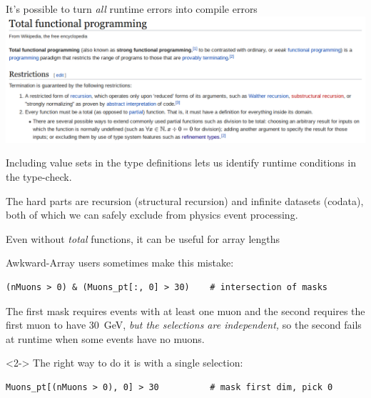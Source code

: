 \documentclass[aspectratio=169]{beamer}
\begin{document}
\begin{frame}{It's possible to turn {\it all} runtime errors into compile errors}
\large
\vspace{0.4 cm}
\includegraphics[width=0.98\linewidth]{totalfunctional-wikipedia.png}

\vspace{0.25 cm}
Including value sets in the type definitions lets us identify runtime conditions in the type-check.

\vspace{0.25 cm}
The hard parts are recursion (structural recursion) and infinite datasets (codata), both of which we can safely exclude from physics event processing.
\end{frame}

\begin{frame}[fragile]{Even without {\it total} functions, it can be useful for array lengths}
\large
\vspace{0.5 cm}

Awkward-Array users sometimes make this mistake:

\small\begin{verbatim}
(nMuons > 0) & (Muons_pt[:, 0] > 30)    # intersection of masks
\end{verbatim}
\large

\vspace{0.25 cm}
The first mask requires events with at least one muon and the second requires the first muon to have 30~GeV, {\it but the selections are independent,} so the second fails at runtime when some events have no muons.

\vspace{0.5 cm}
\begin{uncoverenv}<2->
The right way to do it is with a single selection:

\small\begin{verbatim}
Muons_pt[(nMuons > 0), 0] > 30          # mask first dim, pick 0
\end{verbatim}
\end{uncoverenv}

\large

\vspace{0.25 cm}
\end{frame}
\end{document}
